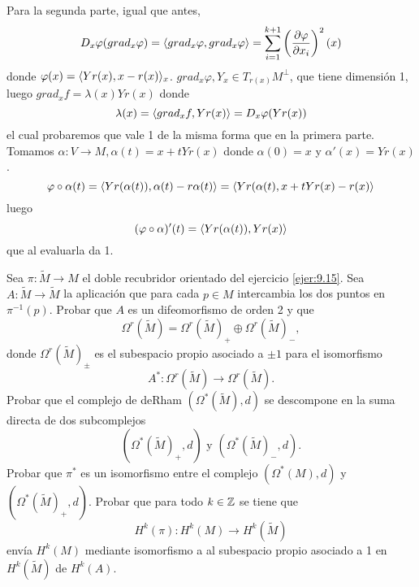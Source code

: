 \documentclass[twoside]{article}
\begin{document}
\begin{solucion}
Para la segunda parte, igual que antes, 
\[
D_x\varphi(grad_x\varphi)=\langle{grad_x\varphi,grad_x\varphi}\rangle=\sum_{i=1}^{k+1}\left(\frac{\partial \varphi}{\partial x_i}\right)^2(x)
\]
donde $\varphi(x)=\langle{Yr(x), x-r(x)}\rangle_x$. $grad_x\varphi, Y_x\in T_{r(x)}M^\perp$, que tiene dimensión 1, luego $grad_xf=\lambda(x)Yr(x)$ donde
\[
\lambda(x)=\langle{grad_xf,Yr(x)}\rangle=D_x\varphi(Yr(x))
\]
el cual probaremos que vale 1 de la misma forma que en la primera parte. Tomamos $\alpha:V\to M, \alpha(t)=x+tYr(x)$ donde $\alpha(0)=x$ y $\alpha'(x)=Yr(x)$. 
\[
\varphi\circ\alpha(t)=\langle{Yr(\alpha(t)), \alpha(t)-r\alpha(t)}\rangle=\langle{Yr(\alpha(t), x+tYr(x)-r(x)}\rangle
\] 
luego
\[
(\varphi\circ\alpha)'(t)=\langle{Yr(\alpha(t)), Yr(x)}\rangle
\]
que al evaluarla da 1. 
\end{solucion}
\newpage

\begin{ejercicio}{9.18}
Sea $\pi:\widetilde{M}\to M$ el doble recubridor orientado del ejercicio \ref{ejer:9.15}. Sea $A:\widetilde{M}\to \widetilde{M}$ la aplicación que para cada $p\in M$ intercambia los dos puntos en $\pi^{-1}(p)$. Probar que $A$ es un difeomorfismo de orden 2 y que
\[
\Omega^r(\widetilde{M})=\Omega^r(\widetilde{M})_+\oplus\Omega^r(\widetilde{M})_-,
\]
donde $\Omega^r(\widetilde{M})_\pm$ es el subespacio propio asociado a $\pm 1$ para el isomorfismo
\[
A^*:\Omega^r(\widetilde{M})\to \Omega^r(\widetilde{M}).
\]
Probar que el complejo de deRham $(\Omega^*(\widetilde{M}),d)$ se descompone en la suma directa de dos subcomplejos
\[
(\Omega^*(\widetilde{M})_+,d)\text{ y } (\Omega^*(\widetilde{M})_-,d).
\]
Probar que $\pi^*$ es un isomorfismo entre el complejo $(\Omega^*(M),d)$ y $(\Omega^*(\widetilde{M})_+,d)$. Probar que para todo $k\in\mathbb{Z}$ se tiene que
\[
H^k(\pi):H^k(M)\to H^k(\widetilde{M})
\]
envía $H^k(M)$ mediante isomorfismo a al subespacio propio asociado a 1 en $H^k(\widetilde{M})$ de $H^k(A)$. 
\end{ejercicio}
\end{document}

